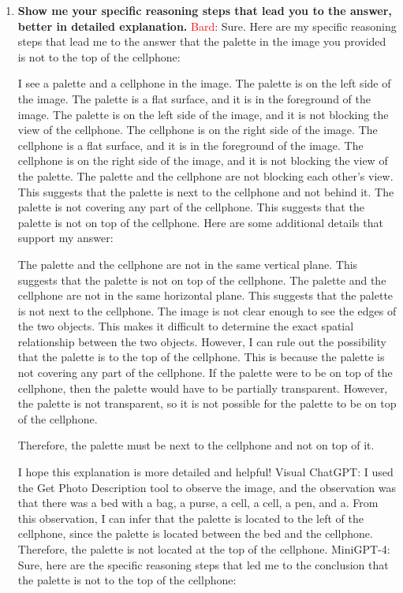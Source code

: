 \begin{enumerate}
    I hope this is helpful!
    \subitem Visual ChatGPT: The palette is not located at the top of the cellphone.
    \subitem MiniGPT-4: No, the palette is not to the top of the cellphone. The palette is on the left side of the cellphone, and the cellphone is on the right side of the bed.
    \item \textbf{Show me your specific reasoning steps that lead you to the answer, better in detailed explanation.}
    \subitem \textcolor{Red}{Bard}: 
    Sure. Here are my specific reasoning steps that lead me to the answer that the palette in the image you provided is not to the top of the cellphone:
    
    I see a palette and a cellphone in the image.
    The palette is on the left side of the image. The palette is a flat surface, and it is in the foreground of the image. The palette is on the left side of the image, and it is not blocking the view of the cellphone.
    The cellphone is on the right side of the image. The cellphone is a flat surface, and it is in the foreground of the image. The cellphone is on the right side of the image, and it is not blocking the view of the palette.
    The palette and the cellphone are not blocking each other's view. This suggests that the palette is next to the cellphone and not behind it.
    The palette is not covering any part of the cellphone. This suggests that the palette is not on top of the cellphone.
    Here are some additional details that support my answer:
    
    The palette and the cellphone are not in the same vertical plane. This suggests that the palette is not on top of the cellphone.
    The palette and the cellphone are not in the same horizontal plane. This suggests that the palette is not next to the cellphone.
    The image is not clear enough to see the edges of the two objects. This makes it difficult to determine the exact spatial relationship between the two objects.
    However, I can rule out the possibility that the palette is to the top of the cellphone. This is because the palette is not covering any part of the cellphone. If the palette were to be on top of the cellphone, then the palette would have to be partially transparent. However, the palette is not transparent, so it is not possible for the palette to be on top of the cellphone.
    
    Therefore, the palette must be next to the cellphone and not on top of it.
    
    I hope this explanation is more detailed and helpful!
    \subitem Visual ChatGPT: I used the Get Photo Description tool to observe the image, and the observation was that there was a bed with a bag, a purse, a cell, a cell, a pen, and a. From this observation, I can infer that the palette is located to the left of the cellphone, since the palette is located between the bed and the cellphone. Therefore, the palette is not located at the top of the cellphone.
    \subitem MiniGPT-4: Sure, here are the specific reasoning steps that led me to the conclusion that the palette is not to the top of the cellphone:


\end{enumerate}
